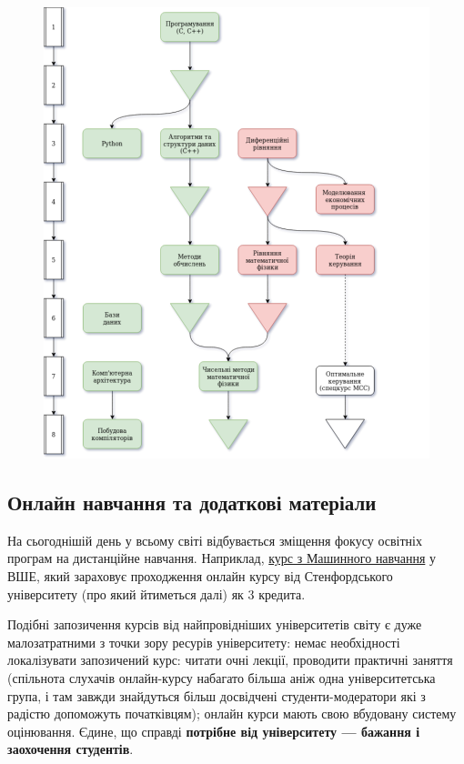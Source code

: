 \documentclass[14pt, a4paper]{extarticle}  %
\begin{document}
\begin{figure}[H]
\centering
\includegraphics[scale=0.57]{CourseworkTree_2.png}
\end{figure}

\newpage
\subsection{Онлайн навчання та додаткові матеріали}
\label{Additional materials}
На сьогоднішій день у всьому світі відбувається зміщення фокусу освітніх програм на дистанційне навчання. Наприклад, \href{https://www.hse.ru/ba/am/courses/219906616.html}{курс з Машинного навчання} у ВШЕ, який зараховує проходження онлайн курсу від Стенфордського університету (про який йтиметься далі) як 3 кредита.

Подібні запозичення курсів від найпровідніших університетів світу є дуже малозатратними з точки зору ресурів університету: немає необхідності локалізувати запозичений курс: читати очні лекції, проводити практичні заняття (спільнота слухачів онлайн-курсу набагато більша аніж одна університетська група, і там завжди знайдуться більш досвідчені студенти-модератори які з радістю допоможуть початківцям); онлайн курси мають свою вбудовану систему оцінювання. Єдине, що справді \textbf{потрібне від університету --- бажання і заохочення студентів}.
\end{document}
